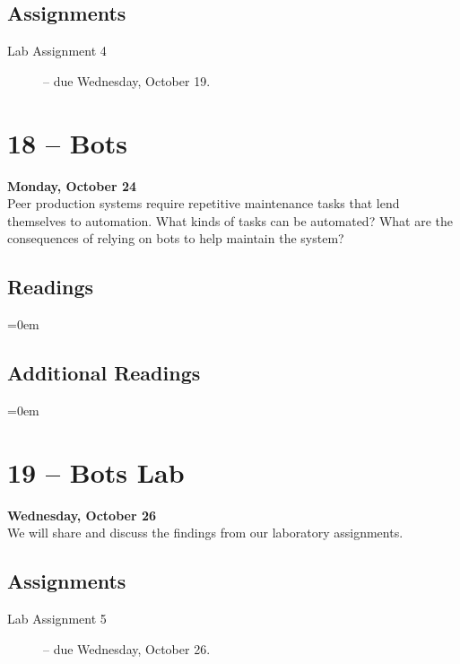 \documentclass[10pt]{memoir}
\newenvironment{readinglist}{
\begin{list}{}{\leftmargin=8pt \itemindent=0em}
  \setlength{\itemsep}{8pt}
  \setlength{\parskip}{0em}
  \setlength{\parsep}{1em}
  \setlength{\parindent}{8em}}
{\end{list}}
\begin{document}
    \subsection{Assignments}
    \begin{description}%
        \item[Lab Assignment 4 ] -- due Wednesday, October 19. 
    \end{description}
    
\section{18 -- Bots}
\textcolor{CUGold}{\textbf{Monday, October 24}}\\
Peer production systems require repetitive maintenance tasks that lend themselves to automation. What kinds of tasks can be automated? What are the consequences of relying on bots to help maintain the system?

    \subsection{Readings}
    \begin{readinglist}
        \item {}
        \item {}
    \end{readinglist}
    
    \subsection{Additional Readings}
    \begin{readinglist}
        \item {}
        \item {}
        \item {}
    \end{readinglist}

\section{19 -- Bots Lab}
\textcolor{CUGold}{\textbf{Wednesday, October 26}}\\
We will share and discuss the findings from our laboratory assignments.

    \subsection{Assignments}
    \begin{description}%
        \item[Lab Assignment 5 ] -- due Wednesday, October 26. 
    \end{description}
    
\end{document}
